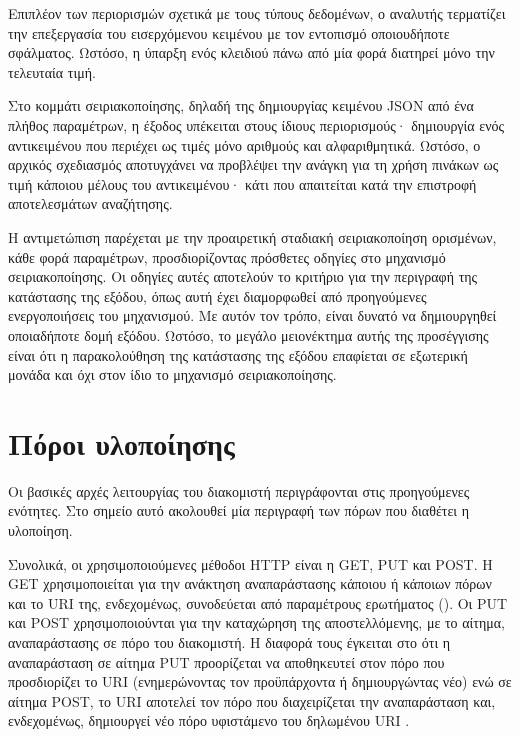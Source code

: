 Επιπλέον των περιορισμών σχετικά με τους τύπους δεδομένων, ο αναλυτής τερματίζει
την επεξεργασία του εισερχόμενου κειμένου με τον εντοπισμό οποιουδήποτε
σφάλματος. Ωστόσο, η ύπαρξη ενός κλειδιού πάνω από μία φορά διατηρεί μόνο την
τελευταία τιμή.

Στο κομμάτι σειριακοποίησης, δηλαδή της δημιουργίας κειμένου JSON από ένα πλήθος
παραμέτρων, η έξοδος υπέκειται στους ίδιους περιορισμούς· δημιουργία ενός
αντικειμένου που περιέχει ως τιμές μόνο αριθμούς και αλφαριθμητικά. Ωστόσο, ο
αρχικός σχεδιασμός αποτυγχάνει να προβλέψει την ανάγκη για τη χρήση πινάκων ως
τιμή κάποιου μέλους του αντικειμένου· κάτι που απαιτείται κατά την επιστροφή
αποτελεσμάτων αναζήτησης.

Η αντιμετώπιση παρέχεται με την προαιρετική σταδιακή σειριακοποίηση ορισμένων,
κάθε φορά παραμέτρων, προσδιορίζοντας πρόσθετες οδηγίες στο μηχανισμό
σειριακοποίησης. Οι οδηγίες αυτές αποτελούν το κριτήριο για την περιγραφή της
κατάστασης της εξόδου, όπως αυτή έχει διαμορφωθεί από προηγούμενες
ενεργοποιήσεις του μηχανισμού. Με αυτόν τον τρόπο, είναι δυνατό να δημιουργηθεί
οποιαδήποτε δομή εξόδου. Ωστόσο, το μεγάλο μειονέκτημα αυτής της προσέγγισης
είναι ότι η παρακολούθηση της κατάστασης της εξόδου επαφίεται σε εξωτερική
μονάδα και όχι στον ίδιο το μηχανισμό σειριακοποίησης.


\section{Πόροι υλοποίησης}
\label{sec:network:impl-resources}


Οι βασικές αρχές λειτουργίας του διακομιστή περιγράφονται στις προηγούμενες
ενότητες. Στο σημείο αυτό ακολουθεί μία περιγραφή των πόρων που διαθέτει η
υλοποίηση.

Συνολικά, οι χρησιμοποιούμενες μέθοδοι HTTP είναι η GET, PUT και POST. Η GET
χρησιμοποιείται για την ανάκτηση αναπαράστασης κάποιου ή κάποιων πόρων και το
URI της, ενδεχομένως, συνοδεύεται από παραμέτρους ερωτήματος
(). Οι PUT και POST χρησιμοποιούνται για την καταχώρηση της
αποστελλόμενης, με το αίτημα, αναπαράστασης σε πόρο του διακομιστή. Η διαφορά
τους έγκειται στο ότι η αναπαράσταση σε αίτημα PUT προορίζεται να αποθηκευτεί
στον πόρο που προσδιορίζει το URI (ενημερώνοντας τον προϋπάρχοντα ή
δημιουργώντας νέο) ενώ σε αίτημα POST, το URI αποτελεί τον πόρο που
διαχειρίζεται την αναπαράσταση και, ενδεχομένως, δημιουργεί νέο πόρο υφιστάμενο
του δηλωμένου URI \parencite[54--55]{rfc2616}.

